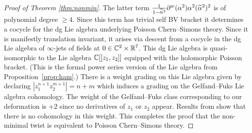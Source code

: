 \begin{proof}[Proof of Theorem \ref{thm:nonmin}]
The latter term $\frac{1}{1 - \widetilde \alpha^3} \partial^w (\alpha^2) \alpha^2 (\widetilde \alpha^2)^2$ is of polynomial degree $\geq 4$. 
Since this term has trivial self BV bracket it determines a cocycle for the dg Lie algebra underlying Poisson Chern--Simons theory. 
Since it is manifestly translation invariant, it arises via descent from a cocycle in the dg Lie algebra of $\infty$-jets of fields at $0 \in\mathbb C^2 \times \mathbb R^7$.
This dg Lie algebra is quasi-isomorphic to the Lie algebra $\mathbb C[[z_1,z_2]]$ equipped with the holomorphic Poisson bracket.
(This is the formal power series version of the Lie algebra from Proposition~\ref{prop:ham}.)
There is a weight grading on this Lie algebra given by declaring $|z_1^{n+1} z_2^{m+1}| = n+m$ which induces a grading on the Gelfand--Fuks Lie algebra cohomology.  
The weight of the Gelfand--Fuks class corresponding to our deformation is $+2$ since no derivatives of $z_1$ or $z_2$ appear. 
Results from \cite{Fuks} show that there is no cohomology in this weight. 
This completes the proof that the non-minimal twist is equivalent to Poisson Chern--Simons theory. 

\end{proof}
%
%
